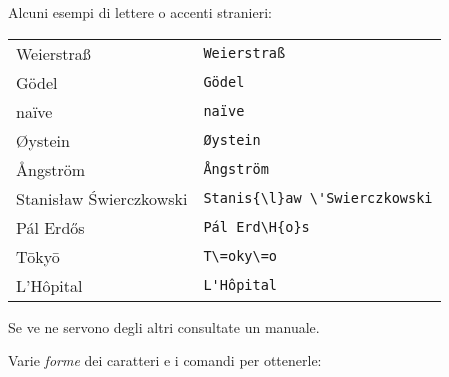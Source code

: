 Alcuni esempi di lettere o accenti stranieri:
\begin{center}
\begin{tabular}{ll}
  Weierstraß& \verb!Weierstraß! \\
  Gödel & \verb!Gödel! \\
  naïve & \verb!naïve! \\
   Øystein & \verb!Øystein! \\
  Ångström & \verb!Ångström! \\
  Stanis{\l}aw \'Swierczkowski & 
    \verb!Stanis{\l}aw \'Swierczkowski! \\
  Pál Erd\H{o}s &
    \verb!Pál Erd\H{o}s! \\
  T\=oky\=o & \verb!T\=oky\=o! \\
  L'Hôpital & \verb!L'Hôpital!
\end{tabular}
\end{center}
Se ve ne servono degli altri consultate un manuale.

\medskip

Varie \emph{forme} dei caratteri e i comandi per
ottenerle:

\medskip

